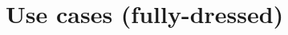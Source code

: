 \documentclass[fontsize=12pt,
               paper=a4,
               twoside=false,
               parskip=half,
               ]{scrartcl}
\begin{document}

\section{Use cases (fully-dressed)}









\end{document}
